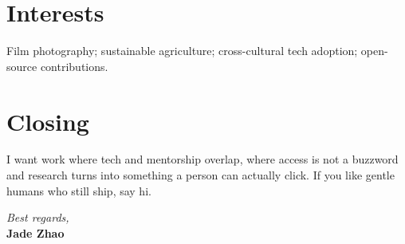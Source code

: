 \documentclass[11pt]{article}
\begin{document}
\section*{Interests}
Film photography; sustainable agriculture; cross-cultural tech adoption; open-source contributions.

\section*{Closing}
I want work where tech and mentorship overlap, where access is not a buzzword and research turns into something a person can actually click. If you like gentle humans who still ship, say hi.

\vspace{0.5em}
\textit{Best regards,}\\
\textbf{Jade Zhao}
\end{document}

